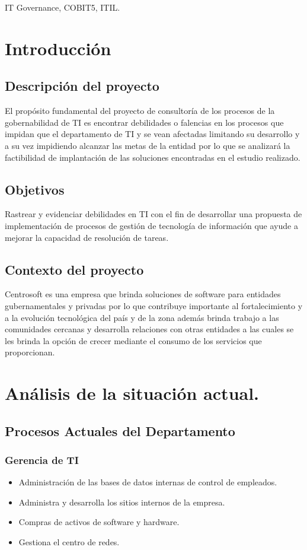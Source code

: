 \documentclass[conference]{IEEEtran}
\begin{document}
\begin{IEEEkeywords}
IT Governance, COBIT5, ITIL.
\end{IEEEkeywords}

\section{Introducción}
\subsection{Descripción del proyecto}

El propósito fundamental del proyecto de consultoría de los procesos de la gobernabilidad de TI es encontrar debilidades o falencias en los procesos que impidan que el departamento de TI y se vean afectadas limitando su desarrollo y a su vez impidiendo alcanzar las metas de la entidad por lo que se analizará la factibilidad de implantación de las soluciones encontradas en el estudio realizado.

\subsection{Objetivos}
Rastrear y evidenciar debilidades en TI con el fin de desarrollar una propuesta de implementación de procesos de gestión de tecnología de información que ayude a mejorar la capacidad de resolución de tareas.


\subsection{Contexto del proyecto}
Centrosoft es una empresa que brinda soluciones de software para entidades gubernamentales y privadas por lo que contribuye importante al fortalecimiento y a la evolución tecnológica del país y de la zona además brinda trabajo a las comunidades cercanas y desarrolla relaciones con otras entidades a las cuales se les brinda la opción de crecer mediante el consumo de los servicios que proporcionan.


\section{Análisis de la situación actual.}
\hbox{}
\subsection{Procesos Actuales del Departamento}
\hbox{}
   \subsubsection{ \textbf{Gerencia de TI}}
   \hbox{}
        \begin{itemize}
        \item Administración de las bases de datos internas de control de empleados.
        \item Administra y desarrolla los sitios internos de la empresa.
        \item Compras de activos de software y hardware.
        \item Gestiona el centro de redes.
        \end{itemize}
    \hbox{}
\end{document}

